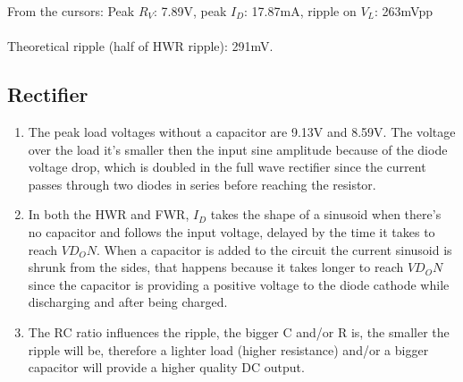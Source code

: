 \documentclass{article}
\begin{document}
\begin{enumerate}
				From the cursors: Peak \(R_V\): 7.89V, peak \(I_D\): 17.87mA, ripple on \(V_L\): 263mVpp\\\\
				Theoretical ripple (half of HWR ripple): 291mV.
			\end{enumerate}
		\subsection{Rectifier}
			\begin{enumerate}
				\item The peak load voltages without a capacitor are 9.13V and 8.59V.
				The voltage over the load it’s smaller then the input sine amplitude because of the diode voltage drop, which is doubled in the full wave rectifier since the current passes through two diodes in series before reaching the resistor.
				\item In both the HWR and FWR, \(I_D\) takes the shape of a sinusoid when there's no capacitor and follows the input voltage, delayed by the time it takes to reach \(VD_ON\). When a capacitor is added to the circuit the current sinusoid is shrunk from the sides, that happens because it takes longer to reach \(VD_ON\) since the capacitor is providing a positive voltage to the diode cathode while discharging and after being charged.
				\item The RC ratio influences the ripple, the bigger C and/or R is, the smaller the ripple will be, therefore a lighter load (higher resistance) and/or a bigger capacitor will provide a higher quality DC output.\\
			\end{enumerate}
\end{document}
